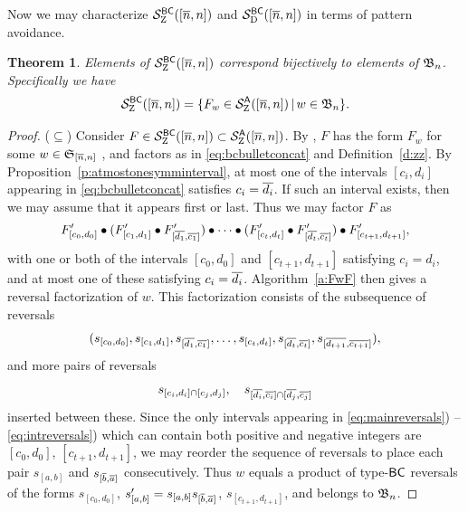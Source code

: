\documentclass[11pt]{article}
\newtheorem{thm}[theo]{Theorem}
\theoremstyle{definition}
\numberwithin{equation}{section}
\begin{document}
Now we may characterize $\mathcal S^{\mathsf{BC}}_{\mathrm Z}([\overline{n}, n])$ and $\mathcal S^{\mathsf{BC}}_{\mathrm D}([\overline{n}, n])$
in terms of pattern avoidance.

\begin{thm}\label{t:znetbcpavoid}
  Elements of $\mathcal S^{\mathsf{BC}}_{\mathrm Z}([\overline{n},n])$ correspond bijectively to
  \pavoiding elements of $\mathfrak{B}_n$.  Specifically we have
  \begin{equation}\label{eq:znetbcseteq}
    \znet{BC}{[\ol n, n]} =
    \{ F_w \in \znet{A}{[\ol n,n]} \,|\, w \in \bn \}.
    \end{equation}
\end{thm}
\begin{proof}
  ($\subseteq$)
  Consider $F \in \mathcal S^{\mathsf{BC}}_{\mathrm Z}([\overline{n},n]) \subset \mathcal S^{\mathsf{A}}_{\mathrm Z}([\overline{n},n])$.
  By \cite[\S 3]{SkanNNDCB}, $F$ has the form $F_w$
  for some $w \in \mathfrak{S}_{\smash{[\overline{n}, n]}}$ \avoidingp, and factors as in
  \eqref{eq:bcbulletconcat}
  and Definition~\ref{d:zz}.
  By Proposition~\ref{p:atmostonesymminterval},
  at most one of the intervals $[c_i,d_i]$ appearing in
  \eqref{eq:bcbulletconcat} satisfies $c_i = \overline{d_i}$.
  If such an interval exists, then we may assume that it appears
  first or last.
  Thus we may factor $F$ as
  \begin{equation*}
    F'_{[c_0,d_0]} \bullet
    (F'_{[c_1,d_1]} \bullet F'_{[\overline{d_1},\overline{c_1}]}) \bullet \cdots \bullet
    (F'_{[c_t,d_t]} \bullet F'_{[\overline{d_t},\overline{c_t}]})
    \bullet F'_{[c_{t+1},d_{t+1}]},
  \end{equation*}
  with one or both of the intervals $[c_0,d_0]$ and $[c_{t+1},d_{t+1}]$
  satisfying $c_i=d_i$, and at most one of these satisfying $c_i = \overline{d_i}$.
  Algorithm~\ref{a:FwF}
  then gives a reversal factorization of $w$.
  This factorization consists of the subsequence of reversals
  \begin{equation}\label{eq:mainreversals}
    (s_{[c_0,d_0]}, s_{[c_1,d_1]}, s_{[\ol{d_1},\ol{c_1}]}, \dotsc,
    s_{[c_t,d_t]}, s_{[\ol{d_t},\ol{c_t}]}, s_{[\ol{d_{t+1}},\ol{c_{t+1}}]}),
  \end{equation}
  and more pairs of reversals 
  \begin{equation}\label{eq:intreversals}
    s_{[c_i,d_i] \cap [c_j,d_j]}, \quad  s_{[\ol{d_i},\ol{c_i}] \cap [\ol{d_j},\ol{c_j}]}
  \end{equation}
  inserted between these.
  Since the only intervals appearing in
  \eqref{eq:mainreversals}) -- \eqref{eq:intreversals})  
  which can contain both positive and negative integers
  are $[c_0,d_0]$, $[c_{t+1},d_{t+1}]$,
  we may reorder the sequence of reversals
  to place each pair $s_{[a,b]}$ and $s_{[\overline{b}, \overline{a}]}$ consecutively.
  Thus $w$ equals a product of type-$\mathsf{BC}$ reversals of the
  forms $s_{[c_0,d_0]}$, $s'_{[a,b]} = s_{[a,b]}s_{[\overline{b}, \overline{a}]}$,
  $s_{[c_{t+1},d_{t+1}]}$, and belongs to $\mathfrak{B}_n$.


\end{proof}
\end{document}
